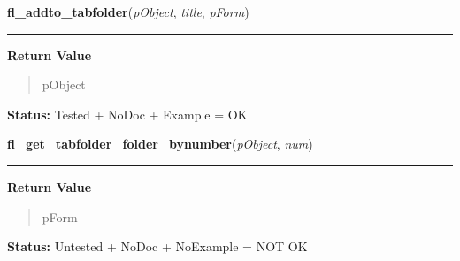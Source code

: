     \label{xformslib:library:fl_addto_tabfolder}

    \vspace{0.5ex}

\hspace{.8\funcindent}\begin{boxedminipage}{\funcwidth}

    \raggedright \textbf{fl\_addto\_tabfolder}(\textit{pObject}, \textit{title}, \textit{pForm})

    \vspace{-1.5ex}

    \rule{\textwidth}{0.5\fboxrule}
\setlength{\parskip}{2ex}
\setlength{\parskip}{1ex}
      \textbf{Return Value}
    \vspace{-1ex}

      \begin{quote}
      pObject

      \end{quote}

\textbf{Status:} Tested + NoDoc + Example = OK



    \end{boxedminipage}

    \label{xformslib:library:fl_get_tabfolder_folder_bynumber}

    \vspace{0.5ex}

\hspace{.8\funcindent}\begin{boxedminipage}{\funcwidth}

    \raggedright \textbf{fl\_get\_tabfolder\_folder\_bynumber}(\textit{pObject}, \textit{num})

    \vspace{-1.5ex}

    \rule{\textwidth}{0.5\fboxrule}
\setlength{\parskip}{2ex}
\setlength{\parskip}{1ex}
      \textbf{Return Value}
    \vspace{-1ex}

      \begin{quote}
      pForm

      \end{quote}

\textbf{Status:} Untested + NoDoc + NoExample = NOT OK



    \end{boxedminipage}

